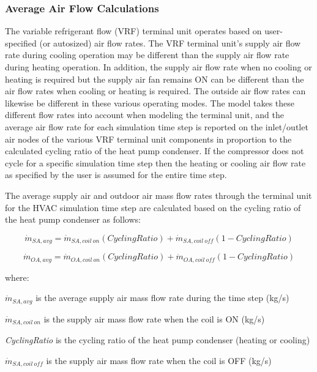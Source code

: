 \subsubsection{Average Air Flow Calculations}\label{average-air-flow-calculations-2}

The variable refrigerant flow (VRF) terminal unit operates based on user-specified (or autosized) air flow rates. The VRF terminal unit's supply air flow rate during cooling operation may be different than the supply air flow rate during heating operation. In addition, the supply air flow rate when no cooling or heating is required but the supply air fan remains ON can be different than the air flow rates when cooling or heating is required. The outside air flow rates can likewise be different in these various operating modes. The model takes these different flow rates into account when modeling the terminal unit, and the average air flow rate for each simulation time step is reported on the inlet/outlet air nodes of the various VRF terminal unit components in proportion to the calculated cycling ratio of the heat pump condenser. If the compressor does not cycle for a specific simulation time step then the heating or cooling air flow rate as specified by the user is assumed for the entire time step.

The average supply air and outdoor air mass flow rates through the terminal unit for the HVAC simulation time step are calculated based on the cycling ratio of the heat pump condenser as follows:

\begin{equation}
  \dot{m}_{SA,avg} = \dot{m}_{SA,coil~on} \left( CyclingRatio \right) + \dot{m}_{SA,coil~off} \left( 1 - CyclingRatio \right)
\end{equation}

\begin{equation}
  \dot{m}_{OA,avg} = \dot{m}_{OA,coil~on} \left( CyclingRatio \right) + \dot{m}_{OA,coil~off} \left( 1 - CyclingRatio \right)
\end{equation}

where:

\(\dot{m}_{SA,avg}\) is the average supply air mass flow rate during the time step (kg/s)

\(\dot{m}_{SA,coil~on}\) is the supply air mass flow rate when the coil is ON (kg/s)

\emph{CyclingRatio} is the cycling ratio of the heat pump condenser (heating or cooling)

\(\dot{m}_{SA,coil~off}\) is the supply air mass flow rate when the coil is OFF (kg/s)

